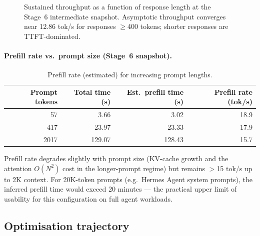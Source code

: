 \documentclass[10pt,a4paper]{article}
\begin{document}
\begin{figure}[H]
\centering
{}
\caption{Sustained throughput as a function of response length at the Stage~6 intermediate snapshot. Asymptotic throughput converges near 12.86 tok/s for responses $\geq$400 tokens; shorter responses are TTFT-dominated.}
\end{figure}

\paragraph{Prefill rate vs.\ prompt size (Stage~6 snapshot).}

\begin{table}[H]
\centering
\caption{Prefill rate (estimated) for increasing prompt lengths.}
\begin{tabular}{rrrr}
\toprule
\textbf{Prompt tokens} & \textbf{Total time (s)} & \textbf{Est.\ prefill time (s)} & \textbf{Prefill rate (tok/s)} \\
\midrule
57    & 3.66    & 3.02   & 18.9 \\
417   & 23.97   & 23.33  & 17.9 \\
2017  & 129.07  & 128.43 & 15.7 \\
\bottomrule
\end{tabular}
\end{table}

Prefill rate degrades slightly with prompt size (KV-cache growth and the attention $O(N^2)$ cost in the longer-prompt regime) but remains $>$15 tok/s up to 2K context. For 20K-token prompts (e.g.\ Hermes Agent system prompts), the inferred prefill time would exceed 20 minutes --- the practical upper limit of usability for this configuration on full agent workloads.

\subsection{Optimisation trajectory}\label{subsec:trajectory}
\end{document}
